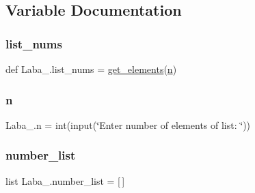 \subsection{Variable Documentation}
\mbox{\label{namespace_laba__3_a914f17bc7cc110fdd3477c9a86a1b41d}} 
\subsubsection{\texorpdfstring{list\+\_\+nums}{list\_nums}}
{\footnotesize\ttfamily def Laba\+\_.\+list\+\_\+nums = \hyperlink{namespace_laba__3_ac5fdf6855efe228c1c4fba42eec68566}{get\+\_\+elements}(\hyperlink{namespace_laba__3_a8c71cdbc127cf2626a591ca43743d078}{n})}

\mbox{\label{namespace_laba__3_a8c71cdbc127cf2626a591ca43743d078}} 
\subsubsection{\texorpdfstring{n}{n}}
{\footnotesize\ttfamily Laba\+\_.\+n = int(input(\char`\"{}Enter number of elements of list\+: \char`\"{}))}

\mbox{\label{namespace_laba__3_ad9a6a68f2ad3c8eed66309eaf71309db}} 
\subsubsection{\texorpdfstring{number\+\_\+list}{number\_list}}
{\footnotesize\ttfamily list Laba\+\_.\+number\+\_\+list = \mbox{[}$\,$\mbox{]}}

